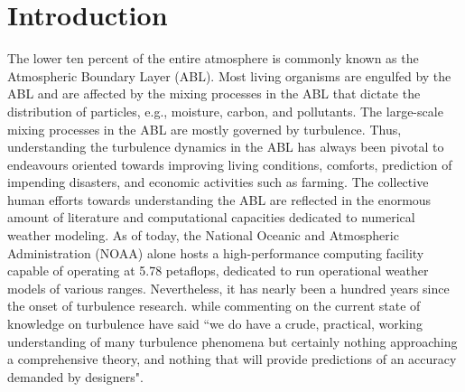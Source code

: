 \chapter{Introduction}\label{chap:intro_chap}
The lower ten percent of the entire atmosphere is commonly known as the Atmospheric Boundary Layer (ABL). Most living organisms are engulfed by the ABL and are affected by the mixing processes in the ABL that dictate the distribution of particles, e.g., moisture, carbon, and pollutants. The large-scale mixing processes in the ABL are mostly governed by turbulence. Thus, understanding the turbulence dynamics in the ABL has always been pivotal to endeavours oriented towards improving living conditions, comforts, prediction of impending disasters, and economic activities such as farming. The collective human efforts towards understanding the ABL are reflected in the enormous amount of literature and computational capacities dedicated to numerical weather modeling. As of today, the National Oceanic and Atmospheric Administration (NOAA) alone hosts a high-performance computing facility capable of operating at 5.78 petaflops, dedicated to run operational weather models of various ranges. Nevertheless, it has nearly been a hundred years since the onset of turbulence research. \citet{lumely_yaglom_FTC_2001}  while commenting on the current state of knowledge on turbulence have said ``we do have a crude, practical, working understanding of many turbulence phenomena but certainly nothing approaching a comprehensive theory, and nothing that will provide predictions of an accuracy demanded by designers". 


